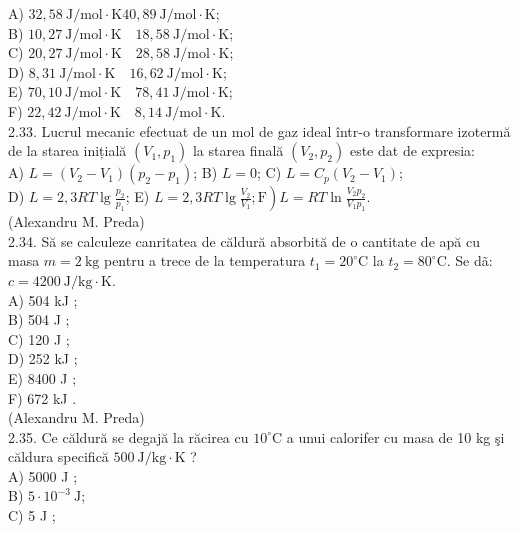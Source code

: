 A) $32,58 \mathrm{~J} / \mathrm{mol} \cdot \mathrm{K} 40,89 \mathrm{~J} / \mathrm{mol} \cdot \mathrm{K}$;\\
B) $10,27 \mathrm{~J} / \mathrm{mol} \cdot \mathrm{K} \quad 18,58 \mathrm{~J} / \mathrm{mol} \cdot \mathrm{K}$;\\
C) $20,27 \mathrm{~J} / \mathrm{mol} \cdot \mathrm{K} \quad 28,58 \mathrm{~J} / \mathrm{mol} \cdot \mathrm{K}$;\\
D) $8,31 \mathrm{~J} / \mathrm{mol} \cdot \mathrm{K} \quad 16,62 \mathrm{~J} / \mathrm{mol} \cdot \mathrm{K}$;\\
E) $70,10 \mathrm{~J} / \mathrm{mol} \cdot \mathrm{K} \quad 78,41 \mathrm{~J} / \mathrm{mol} \cdot \mathrm{K}$;\\
F) $22,42 \mathrm{~J} / \mathrm{mol} \cdot \mathrm{K} \quad 8,14 \mathrm{~J} / \mathrm{mol} \cdot \mathrm{K}$.\\
2.33. Lucrul mecanic efectuat de un mol de gaz ideal într-o transformare izotermă de la starea inițială $\left(V_{1}, p_{1}\right)$ la starea finală $\left(V_{2}, p_{2}\right)$ este dat de expresia:\\
A) $L=\left(V_{2}-V_{1}\right)\left(p_{2}-p_{1}\right)$; B) $L=0$; C) $L=C_{p}\left(V_{2}-V_{1}\right)$;\\
D) $L=2,3 R T \lg \frac{p_{2}}{p_{1}}$; E) $\left.L=2,3 R T \lg \frac{V_{2}}{V_{1}} ; \mathrm{F}\right) L=R T \ln \frac{V_{2} p_{2}}{V_{1} p_{1}}$.\\
(Alexandru M. Preda)\\
2.34. Să se calculeze canritatea de căldură absorbită de o cantitate de apă cu masa $m=2 \mathrm{~kg}$ pentru a trece de la temperatura $t_{1}=20^{\circ} \mathrm{C}$ la $t_{2}=80^{\circ} \mathrm{C}$. Se dã: $c=4200 \mathrm{~J} / \mathrm{kg} \cdot \mathrm{K}$.\\
A) 504 kJ ;\\
B) 504 J ;\\
C) 120 J ;\\
D) 252 kJ ;\\
E) 8400 J ;\\
F) 672 kJ .\\
(Alexandru M. Preda)\\
2.35. Ce căldură se degajă la răcirea cu $10^{\circ} \mathrm{C}$ a unui calorifer cu masa de 10 kg şi căldura specifică $500 \mathrm{~J} / \mathrm{kg} \cdot \mathrm{K}$ ?\\
A) 5000 J ;\\
B) $5 \cdot 10^{-3} \mathrm{~J}$;\\
C) 5 J ;\\
